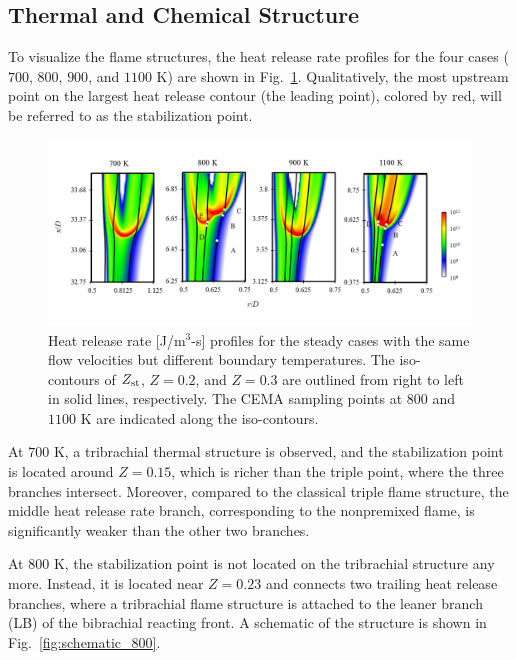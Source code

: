 \subsection{Thermal and Chemical Structure} \label{sec:dynamcis-structure_T}

To visualize the flame structures, the heat release rate profiles for the four cases ($700$, $800$, $900$, and $1100$ K) are shown in Fig.~\ref{fig:dynamics-HRR_T}.  Qualitatively, the most upstream point on the largest heat release contour (the leading point), colored by red, will be referred to as the stabilization point.  

\begin{figure}[t]
  \centering
  \scriptsize
  \includegraphics[width=1.0\textwidth]{ch-dynamics/HRR_T.png}
  \normalsize
  \caption{Heat release rate [J/m$^3$-s] profiles for the steady cases with the same flow velocities but different boundary temperatures.  The iso-contours of $Z_{\rm st}$, $Z = 0.2$, and $Z = 0.3$ are outlined from right to left in solid lines, respectively.  The CEMA sampling points at $800$ and $1100$ K are indicated along the iso-contours.}
  \label{fig:dynamics-HRR_T}
\end{figure}

At $700$ K, a tribrachial thermal structure is observed, and the stabilization point is located around $Z = 0.15$, which is richer than the triple point, where the three branches intersect.  Moreover, compared to the classical triple flame structure, the middle heat release rate branch, corresponding to the nonpremixed flame, is significantly weaker than the other two branches.  

At $800$ K, the stabilization point is not located on the tribrachial structure any more.  Instead, it is located near $Z = 0.23$ and connects two trailing heat release branches, where a tribrachial flame structure is attached to the leaner branch (LB) of the bibrachial reacting front.  A schematic of the structure is shown in Fig.~\ref{fig:schematic_800}.

